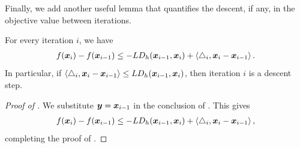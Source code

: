 Finally, we add another useful lemma that quantifies the descent, if any, in the objective value between iterations.

\begin{lemma}
\label{lemma:gp_md_descent}
For every iteration $i$, we have
\begin{align*}
    f(\bm{x}_i)-f(\bm{x}_{i-1}) \le -LD_h(\bm{x}_{i-1},\bm{x}_i) + \left\langle \triangle_i,\bm{x}_i-\bm{x}_{i-1} \right\rangle.
\end{align*}
In particular, if $\left\langle \triangle_i,\bm{x}_{i}-\bm{x}_{i-1} \right\rangle \le LD_h(\bm{x}_{i-1},\bm{x}_i)$, then iteration $i$ is a descent step.
\end{lemma}
\begin{proof}[Proof of ]
We substitute $\bm{y}=\bm{x}_{i-1}$ in the conclusion of . This gives
\begin{align*}
    f(\bm{x}_i)-f(\bm{x}_{i-1}) \le -LD_h(\bm{x}_{i-1},\bm{x}_i) + \left\langle \triangle_i,\bm{x}_i-\bm{x}_{i-1} \right\rangle,
\end{align*}
completing the proof of .
\end{proof}
